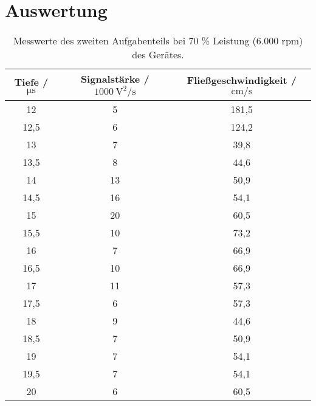 \section{Auswertung}
\label{sec:Auswertung}



\begin{table}[H]
  \centering
  \caption{Messwerte des zweiten Aufgabenteils bei 70 \% Leistung (6.000 rpm) des Gerätes.}
  \label{tab:Werte1}
  \begin{tabular}{c c c}
    \toprule
    Tiefe / $\si{\micro\second}$ & Signalstärke / $\SI{1000}{\square\volt\per\second}$ & Fließgeschwindigkeit / $\si{\centi\meter\per\second}$ \\
    \midrule
    12 & 5 & 181,5 \\
    12,5 & 6 & 124,2 \\
    13 & 7 & 39,8 \\
    13,5 & 8 & 44,6 \\
    14 & 13 & 50,9 \\
    14,5 & 16 & 54,1 \\
    15 & 20  & 60,5 \\
    15,5 & 10 & 73,2 \\
    16 & 7 & 66,9 \\
    16,5 & 10 & 66,9 \\
    17 & 11 & 57,3 \\
    17,5 & 6 & 57,3 \\
    18 & 9 & 44,6 \\
    18,5 & 7 & 50,9 \\
    19 & 7 & 54,1 \\
    19,5 & 7 & 54,1 \\
    20 & 6 & 60,5 \\
    \bottomrule
  \end{tabular}
\end{table}


